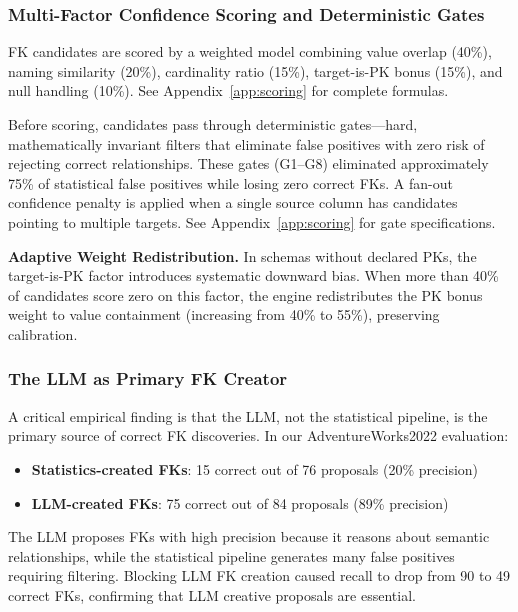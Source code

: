 \documentclass[twocolumn]{svjour3}
\begin{document}
\subsubsection{Multi-Factor Confidence Scoring and Deterministic Gates}

FK candidates are scored by a weighted model combining value overlap (40\%), naming similarity (20\%), cardinality ratio (15\%), target-is-PK bonus (15\%), and null handling (10\%). See Appendix~\ref{app:scoring} for complete formulas.

Before scoring, candidates pass through deterministic gates---hard, mathematically invariant filters that eliminate false positives with zero risk of rejecting correct relationships. These gates (G1--G8) eliminated approximately 75\% of statistical false positives while losing zero correct FKs. A fan-out confidence penalty is applied when a single source column has candidates pointing to multiple targets. See Appendix~\ref{app:scoring} for gate specifications.

\textbf{Adaptive Weight Redistribution.} In schemas without declared PKs, the target-is-PK factor introduces systematic downward bias. When more than 40\% of candidates score zero on this factor, the engine redistributes the PK bonus weight to value containment (increasing from 40\% to 55\%), preserving calibration.

\subsubsection{The LLM as Primary FK Creator}

A critical empirical finding is that the LLM, not the statistical pipeline, is the primary source of correct FK discoveries. In our AdventureWorks2022 evaluation:

\begin{itemize}
    \item \textbf{Statistics-created FKs}: 15 correct out of 76 proposals (20\% precision)
    \item \textbf{LLM-created FKs}: 75 correct out of 84 proposals (89\% precision)
\end{itemize}

The LLM proposes FKs with high precision because it reasons about semantic relationships, while the statistical pipeline generates many false positives requiring filtering. Blocking LLM FK creation caused recall to drop from 90 to 49 correct FKs, confirming that LLM creative proposals are essential.
\end{document}
